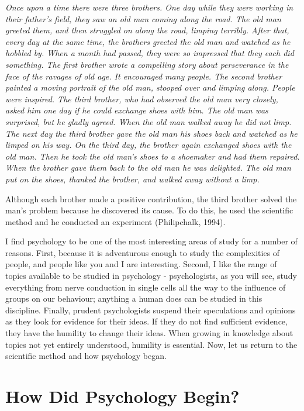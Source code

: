 \documentclass[
]{book}
\begin{document}
\emph{Once upon a time there were three brothers. One day while they were working in their father's field, they saw an old man coming along the road. The old man greeted them, and then struggled on along the road, limping terribly. After that, every day at the same time, the brothers greeted the old man and watched as he hobbled by. When a month had passed, they were so impressed that they each did something. The first brother wrote a compelling story about perseverance in the face of the ravages of old age. It encouraged many people. The second brother painted a moving portrait of the old man, stooped over and limping along. People were inspired. The third brother, who had observed the old man very closely, asked him one day if he could exchange shoes with him. The old man was surprised, but he gladly agreed. When the old man walked away he did not limp. The next day the third brother gave the old man his shoes back and watched as he limped on his way. On the third day, the brother again exchanged shoes with the old man. Then he took the old man's shoes to a shoemaker and had them repaired. When the brother gave them back to the old man he was delighted. The old man put on the shoes, thanked the brother, and walked away without a limp.}

Although each brother made a positive contribution, the third brother solved the man's problem because he discovered its cause. To do this, he used the scientific method and he conducted an experiment (Philipchalk, 1994).

I find psychology to be one of the most interesting areas of study for a number of reasons. First, because it is adventurous enough to study the complexities of people, and people like you and I are interesting. Second, I like the range of topics available to be studied in psychology - psychologists, as you will see, study everything from nerve conduction in single cells all the way to the influence of groups on our behaviour; anything a human does can be studied in this discipline. Finally, prudent psychologists suspend their speculations and opinions as they look for evidence for their ideas. If they do not find sufficient evidence, they have the humility to change their ideas. When growing in knowledge about topics not yet entirely understood, humility is essential. Now, let us return to the scientific method and how psychology began.

\hypertarget{how-did-psychology-begin}{%
\section{How Did Psychology Begin?}\label{how-did-psychology-begin}}
\end{document}
